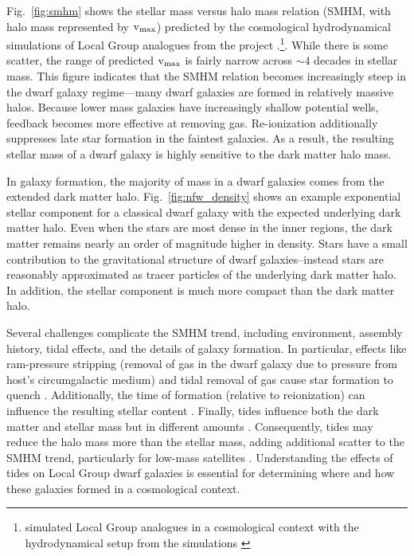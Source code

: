 Fig.~\ref{fig:smhm} shows the stellar mass versus halo mass relation
(SMHM, with halo mass represented by \({\rm v}_{\rm max}\)) predicted by the \LCDM{}
cosmological hydrodynamical simulations of Local Group analogues from
the \apostle{} project \citep{sawala+2016}.\footnote{\apostle{}
  simulated Local Group analogues in a \LCDM{} cosmological context with
  the hydrodynamical setup from the \eagle{} simulations
  \citep{crain+2015, schaye+2015}}. While there is some scatter, the
range of predicted \({\rm v}_{\rm max}\) is fairly narrow across \(\sim 4\) decades
in stellar mass. This figure indicates that the SMHM relation becomes
increasingly steep in the dwarf galaxy regime---many dwarf galaxies are
formed in relatively massive halos. Because lower mass galaxies have
increasingly shallow potential wells, feedback becomes more effective at
removing gas. Re-ionization additionally suppresses late star formation
in the faintest galaxies. As a result, the resulting stellar mass of a
dwarf galaxy is highly sensitive to the dark matter halo mass.

In \LCDM{} galaxy formation, the majority of mass in a dwarf galaxies
comes from the extended dark matter halo. Fig.~\ref{fig:nfw_density}
shows an example exponential stellar component for a classical dwarf
galaxy with the expected underlying dark matter halo. Even when the
stars are most dense in the inner regions, the dark matter remains
nearly an order of magnitude higher in density. Stars have a small
contribution to the gravitational structure of dwarf galaxies--instead
stars are reasonably approximated as tracer particles of the underlying
dark matter halo. In addition, the stellar component is much more
compact than the dark matter halo.

Several challenges complicate the SMHM trend, including environment,
assembly history, tidal effects, and the details of galaxy formation. In
particular, effects like ram-pressure stripping (removal of gas in the
dwarf galaxy due to pressure from host's circumgalactic medium) and
tidal removal of gas cause star formation to quench
\citep[e.g.,][]{christensen+2024}. Additionally, the time of formation
(relative to reionization) can influence the resulting stellar content
\citep{kim+2024}. Finally, tides influence both the dark matter and
stellar mass but in different amounts \citep[e.g.,][]{PNM2008}.
Consequently, tides may reduce the halo mass more than the stellar mass,
adding additional scatter to the SMHM trend, particularly for low-mass
satellites \citep[e.g.,][]{fattahi+2018}. Understanding the effects of
tides on Local Group dwarf galaxies is essential for determining where
and how these galaxies formed in a cosmological context.

